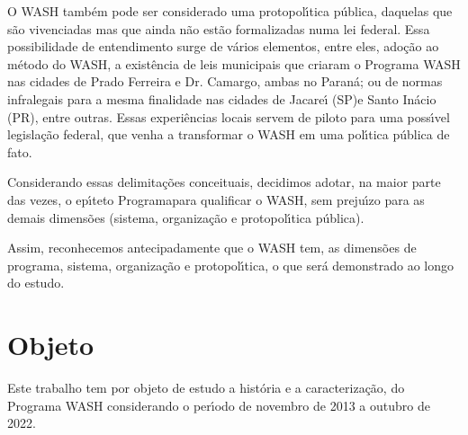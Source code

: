 \documentclass[
12pt,		%
openright,	%
twoside,  %
a4paper,			%
chapter=TITLE,		%
english,			%
french,				%
spanish,			%
brazil				%
]{USPSC-classe/USPSC}
\begin{document}
O WASH tamb\'em pode ser considerado uma protopol\'{\i}tica p\'ublica, daquelas que s\~ao vivenciadas mas que ainda n\~ao est\~ao formalizadas numa lei federal. Essa possibilidade de entendimento surge de v\'arios elementos, entre eles, ado\c{c}\~ao ao m\'etodo do WASH, a exist\^encia de leis municipais que criaram o Programa WASH nas cidades de Prado Ferreira e Dr. Camargo, ambas no Paran\'a; ou de normas infralegais para a mesma finalidade nas cidades de Jacare\'{\i} (SP)e Santo In\'acio (PR), entre outras. Essas experi\^encias locais servem de piloto para uma poss\'{\i}vel legisla\c{c}\~ao federal, que venha a transformar o WASH em uma pol\'{\i}tica p\'ublica de fato.

















Considerando essas delimita\c{c}\~oes conceituais, decidimos adotar, na maior parte das vezes, o ep\'{\i}teto \textquotedbl Programa\textquotedbl  para qualificar o WASH, sem preju\'{\i}zo para as demais dimens\~oes (sistema, organiza\c{c}\~ao e protopol\'{\i}tica p\'ublica).

















Assim, reconhecemos antecipadamente que o WASH tem, as dimens\~oes de programa, sistema, organiza\c{c}\~ao e protopol\'{\i}tica, o que ser\'a demonstrado ao longo do estudo.

















\section[Objeto]{Objeto}\label{Objeto}
Este trabalho tem por objeto de estudo a hist\'oria e a caracteriza\c{c}\~ao, do Programa WASH considerando o per\'{\i}odo de novembro de 2013 a outubro de 2022.
\end{document}
